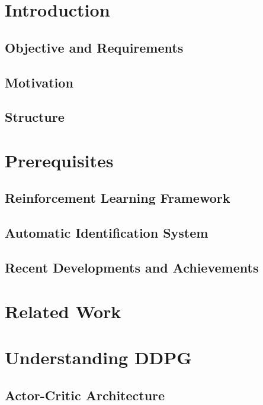 \section{Introduction}
 \label{chap:intro}
    \subsection{Objective and Requirements}\label{subchap:objective}
    
    \subsection{Motivation}
    
    \subsection{Structure}
    
    
\newpage
\section{Prerequisites}\label{chap:prerequisites}
    \subsection{Reinforcement Learning Framework}\label{chap:rlframework}
    
    \subsection{Automatic Identification System}\label{chap:ais}
    
    \subsection{Recent Developments and Achievements}
    
\newpage
\section{Related Work}\label{chap:relatedWork}


\newpage
\section{Understanding DDPG}\label{chap:DDPG}

    \subsection{Actor-Critic Architecture}
    
